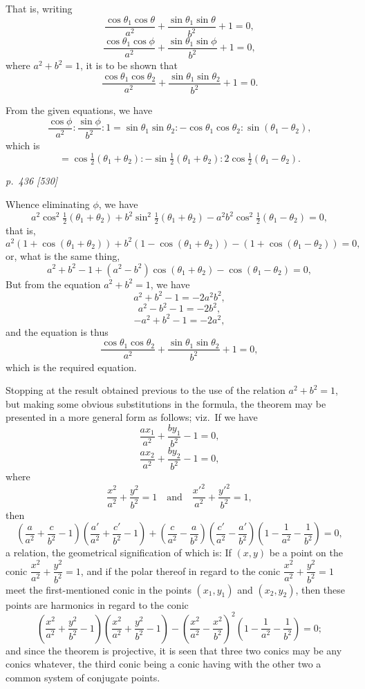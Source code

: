 \documentclass[11pt,a4paper]{book}
\begin{document}
That is, writing
\[
\frac{\cos\theta_1\cos\theta}{a^2} + \frac{\sin\theta_1\sin\theta}{b^2} + 1 = 0,
\]
\[
\frac{\cos\theta_1\cos\phi}{a^2} + \frac{\sin\theta_1\sin\phi}{b^2} + 1 = 0,
\]
where $a^2 + b^2 = 1$, it is to be shown that
\[
\frac{\cos\theta_1\cos\theta_2}{a^2} + \frac{\sin\theta_1\sin\theta_2}{b^2} + 1 = 0.
\]

From the given equations, we have
\[
\frac{\cos\phi}{a^2}:\frac{\sin\phi}{b^2}:1 = \sin\theta_1\sin\theta_2:-\cos\theta_1\cos\theta_2:\sin(\theta_1 - \theta_2),
\]
which is
\[
= \cos\tfrac{1}{2}(\theta_1 + \theta_2):-\sin\tfrac{1}{2}(\theta_1 + \theta_2):2\cos\tfrac{1}{2}(\theta_1 - \theta_2).
\]

\clearpage

\bigskip
\textit{p.~436 [530]}
\smallskip

Whence eliminating $\phi$, we have
\[
a^2\cos^2\tfrac{1}{2}(\theta_1 + \theta_2) + b^2\sin^2\tfrac{1}{2}(\theta_1 + \theta_2) - a^2 b^2\cos^2\tfrac{1}{2}(\theta_1 - \theta_2) = 0,
\]
that is,
\[
a^2(1 + \cos(\theta_1 + \theta_2)) + b^2(1 - \cos(\theta_1 + \theta_2)) - (1 + \cos(\theta_1 - \theta_2)) = 0,
\]
or, what is the same thing,
\[
a^2 + b^2 - 1 + (a^2 - b^2)\cos(\theta_1 + \theta_2) - \cos(\theta_1 - \theta_2) = 0,
\]
But from the equation $a^2 + b^2 = 1$, we have
\[
a^2 + b^2 - 1 = - 2a^2 b^2,
\]
\[
a^2 - b^2 - 1 = - 2b^2,
\]
\[
- a^2 + b^2 - 1 = - 2a^2,
\]
and the equation is thus
\[
\frac{\cos\theta_1\cos\theta_2}{a^2} + \frac{\sin\theta_1\sin\theta_2}{b^2} + 1 = 0,
\]
which is the required equation.

Stopping at the result obtained previous to the use of the relation $a^2 + b^2 = 1$,
but making some obvious substitutions in the formula, the theorem may be presented in
a more general form as follows; viz.\
If we have
\[
\frac{ax_1}{a^2} + \frac{by_1}{b^2} - 1 = 0,
\]
\[
\frac{ax_2}{a^2} + \frac{by_2}{b^2} - 1 = 0,
\]
where
\[
\frac{x^2}{a^2} + \frac{y^2}{b^2} = 1 \quad \text{and}\quad \frac{x'^2}{a^2} + \frac{y'^2}{b^2} = 1,
\]
then
\[
\left(\frac{a}{a^2} + \frac{c}{b^2} - 1\right)\left(\frac{a'}{a^2} + \frac{c'}{b^2} - 1\right) + \left(\frac{c}{a^2} - \frac{a}{b^2}\right)\left(\frac{c'}{a^2} - \frac{a'}{b^2}\right)\left(1 - \frac{1}{a^2} - \frac{1}{b^2}\right) = 0,
\]
a relation, the geometrical signification of which is: If $(x, y)$ be a point on the conic
$\dfrac{x^2}{a^2} + \dfrac{y^2}{b^2} = 1$, and if the polar thereof in regard to the conic $\dfrac{x^2}{a^2} + \dfrac{y^2}{b^2} = 1$ meet the
first-mentioned conic in the points $(x_1, y_1)$ and $(x_2, y_2)$, then these points are harmonics
in regard to the conic
\[
\left(\frac{x^2}{a^2} + \frac{y^2}{b^2} - 1\right)\left(\frac{x^2}{a^2} + \frac{y^2}{b^2} - 1\right) - \left(\frac{x^2}{a^2} - \frac{x^2}{b^2}\right)^2 \left(1 - \frac{1}{a^2} - \frac{1}{b^2}\right) = 0;
\]
and since the theorem is projective, it is seen that three two conics may be any
conics whatever, the third conic being a conic having with the other two a common
system of conjugate points.
\end{document}
